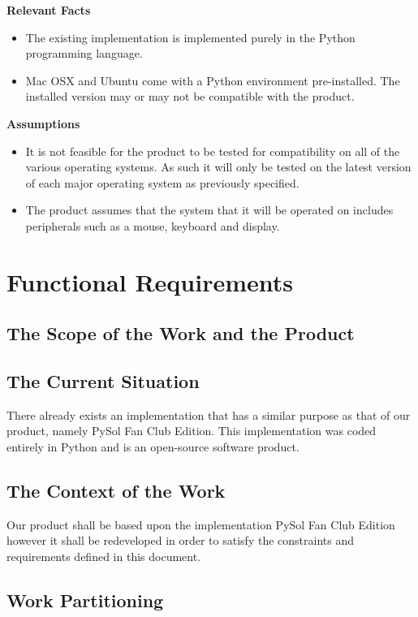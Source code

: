 \documentclass{article}
\begin{document}
		\textbf{Relevant Facts}
		\vspace{-2mm}
		\begin{itemize}
			\itemsep0em
			\item The existing implementation is implemented purely in 
			the Python programming language.
			\item Mac OSX and Ubuntu come with a Python environment 
			pre-installed. The installed version may or may not be compatible 
			with 
			the product.
		\end{itemize}
		\textbf{Assumptions}
		\vspace{-2mm}
		\begin{itemize}
			\itemsep0em
			\item 	It is not feasible for the product to be tested for 
			compatibility on all of the various operating systems. As such it 
			will only be tested on the latest version of each major operating 
			system as previously specified.
			\item The product assumes that the system that it will be operated 
			on includes peripherals such as a mouse, keyboard and display.
		\end{itemize}
		
	\section{Functional Requirements}
		\subsection*{The Scope of the Work and the Product}
		\subsection{The Current Situation}
		\indent There already exists an implementation that has a similar purpose as
		that of our product, namely PySol Fan Club Edition. This implementation was
		coded entirely in Python and is an open-source software product.\\
		\subsection{The Context of the Work}
		\indent Our product shall be based upon the implementation PySol Fan Club
		Edition however it shall be redeveloped in order to satisfy the constraints
		and requirements defined in this document.\\
		\subsection{Work Partitioning}
\end{document}
